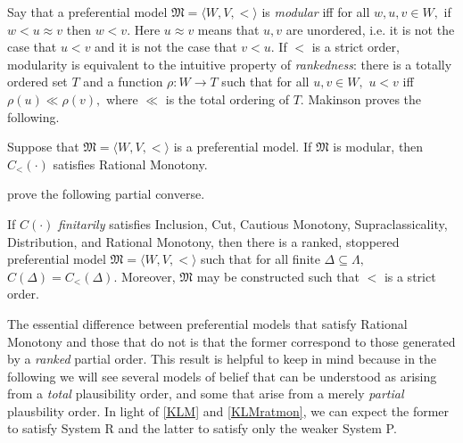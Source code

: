 Say that a preferential model $\mathfrak{M} = \langle W,V, < \rangle$ is {\em
modular} iff for all $w,u,v \in W,$ if $w< u \approx v$ then $w< v.$ Here
$u\approx v$ means that $u,v$ are unordered, i.e. it is not the case that $u<v$
and it is not the case that $v<u$. If $<$ is a strict order, modularity is
equivalent to the intuitive property of {\em rankedness}: there is a totally
ordered set $T$ and a function $\rho : W \rightarrow T$ such that for all
$u,v\in W,$ $u<v$ iff $\rho(u)\ll\rho(v),$ where $\ll$ is the total ordering of
$T$. Makinson proves the following.
\begin{theorem}
Suppose that $\mathfrak{M} = \langle W,V, <\rangle$ is a preferential model. If
$\mathfrak{M}$ is modular, then $C_<(\cdot)$ satisfies Rational Monotony.
\end{theorem}
\citet{kraus1990nonmonotonic} prove the following partial converse.
\begin{theorem}\label{KLMratmon}
If $C(\cdot)$  {\em finitarily} satisfies Inclusion, Cut, Cautious Monotony,
Supraclassicality, Distribution, and Rational Monotony, then there is a ranked,
stoppered preferential model $\mathfrak{M} = \langle W,V, <\rangle$ such that
for all finite $\Delta \subseteq \Lambda,$ $C(\Delta)=C_<(\Delta).$ Moreover,
$\mathfrak{M}$ may be constructed such that $<$ is a strict order.  
\end{theorem}
The essential difference between preferential models that satisfy Rational
Monotony and those that do not is that the former correspond to those generated
by a {\em ranked} partial order. This result is helpful to keep in mind because
in the following we will see several models of belief that can be understood as
arising from a {\em total} plausibility order, and some that arise from a merely
{\em partial} plausbility order. In light of \autoref{KLM} and
\autoref{KLMratmon}, we can expect the former to satisfy System R and the latter
to satisfy only the weaker System P. 





